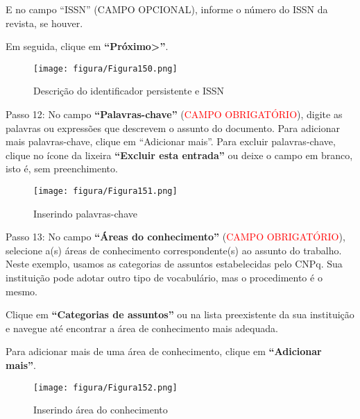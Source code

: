\documentclass[12pt,hidelinks]{article}
\begin{document}
\newpage
    
    E no campo “ISSN” (\textcolor{applegreen}{CAMPO OPCIONAL}), informe o número do ISSN da revista, se houver.
    
    Em seguida, clique em \textbf{“Próximo>”}.
    
    \begin{figure}[!htp]
                \centering
                \texttt{[image: figura/Figura150.png]}
                \caption{Descrição do identificador persistente e ISSN}
            \label{Rotulo}
        \end{figure}
    
    Passo 12: No campo \textbf{“Palavras-chave”} (\textcolor{red}{CAMPO OBRIGATÓRIO}), digite as palavras ou expressões que descrevem o assunto do documento. Para adicionar mais palavras-chave, clique em “Adicionar mais”. Para excluir palavras-chave, clique no ícone da lixeira \textbf{“Excluir esta entrada”} ou deixe o campo em branco, isto é, sem preenchimento.
    
    \begin{figure}[!htp]
                \centering
                \texttt{[image: figura/Figura151.png]}
                \caption{Inserindo palavras-chave}
            \label{Rotulo}
        \end{figure}
    
    Passo 13: No campo \textbf{“Áreas do conhecimento”} (\textcolor{red}{CAMPO OBRIGATÓRIO}), selecione a(s) áreas de conhecimento correspondente(s) ao assunto do trabalho. Neste exemplo, usamos as categorias de assuntos estabelecidas pelo CNPq. Sua instituição pode adotar outro tipo de vocabulário, mas o procedimento é o mesmo. 
    
    \singlespacing
    
    Clique em \textbf{“Categorias de assuntos”} ou na lista preexistente da sua instituição e navegue até encontrar a área de conhecimento mais adequada.
    
    \singlespacing
    
    Para adicionar mais de uma área de conhecimento, clique em \textbf{“Adicionar mais”}.
    
\newpage

    \begin{figure}[!htp]
                \centering
                \texttt{[image: figura/Figura152.png]}
                \caption{Inserindo área do conhecimento}
            \label{Rotulo}
        \end{figure}
    
\end{document}
